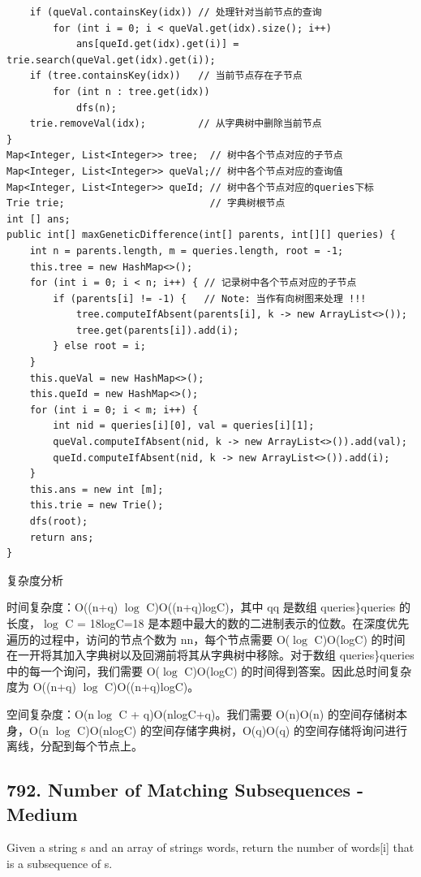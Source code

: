 \documentclass[9pt, b5paaper]{book}
\begin{document}
\begin{verbatim}
    if (queVal.containsKey(idx)) // 处理针对当前节点的查询
        for (int i = 0; i < queVal.get(idx).size(); i++) 
            ans[queId.get(idx).get(i)] = trie.search(queVal.get(idx).get(i));
    if (tree.containsKey(idx))   // 当前节点存在子节点
        for (int n : tree.get(idx)) 
            dfs(n);
    trie.removeVal(idx);         // 从字典树中删除当前节点
}
Map<Integer, List<Integer>> tree;  // 树中各个节点对应的子节点
Map<Integer, List<Integer>> queVal;// 树中各个节点对应的查询值
Map<Integer, List<Integer>> queId; // 树中各个节点对应的queries下标
Trie trie;                         // 字典树根节点
int [] ans;
public int[] maxGeneticDifference(int[] parents, int[][] queries) {
    int n = parents.length, m = queries.length, root = -1;
    this.tree = new HashMap<>();
    for (int i = 0; i < n; i++) { // 记录树中各个节点对应的子节点
        if (parents[i] != -1) {   // Note: 当作有向树图来处理 !!!
            tree.computeIfAbsent(parents[i], k -> new ArrayList<>());
            tree.get(parents[i]).add(i);
        } else root = i;  
    }
    this.queVal = new HashMap<>();
    this.queId = new HashMap<>();
    for (int i = 0; i < m; i++) {
        int nid = queries[i][0], val = queries[i][1];
        queVal.computeIfAbsent(nid, k -> new ArrayList<>()).add(val);
        queId.computeIfAbsent(nid, k -> new ArrayList<>()).add(i);
    }
    this.ans = new int [m];
    this.trie = new Trie();
    dfs(root);
    return ans;
}
\end{verbatim}

复杂度分析

时间复杂度：O((n+q) $\log$ C)O((n+q)logC)，其中 qq 是数组 queries\}queries 的长度，$\log$ C = 18logC=18 是本题中最大的数的二进制表示的位数。在深度优先遍历的过程中，访问的节点个数为 nn，每个节点需要 O($\log$ C)O(logC) 的时间在一开将其加入字典树以及回溯前将其从字典树中移除。对于数组 queries\}queries 中的每一个询问，我们需要 O($\log$ C)O(logC) 的时间得到答案。因此总时间复杂度为 O((n+q) $\log$ C)O((n+q)logC)。

空间复杂度：O(n$\log$ C + q)O(nlogC+q)。我们需要 O(n)O(n) 的空间存储树本身，O(n $\log$ C)O(nlogC) 的空间存储字典树，O(q)O(q) 的空间存储将询问进行离线，分配到每个节点上。

\subsection{792. Number of Matching Subsequences - Medium}
\label{sec-2-1-8}
Given a string s and an array of strings words, return the number of words[i] that is a subsequence of s.
\end{document}
